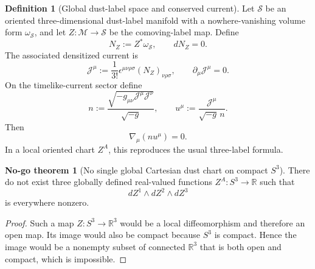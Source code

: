 \documentclass[11pt,a4paper]{article}
\def\dd{d}%
\numberwithin{equation}{section}
\theoremstyle{definition}
\newtheorem{definition}[criterion]{Definition}
\newtheorem{nogotheorem}[criterion]{No-go theorem}
\theoremstyle{plain}
\theoremstyle{remark}
\newcommand{\M}{\mathcal{M}}
\newcommand{\dd}{\mathrm{d}}
\begin{document}
\begin{definition}[Global dust-label space and conserved current]
Let \(\mathcal S\) be an oriented three-dimensional dust-label manifold with
a nowhere-vanishing volume form \(\omega_{\mathcal S}\), and let
\(Z:\M\to\mathcal S\) be the comoving-label map. Define
\begin{equation}
N_Z:=Z^*\omega_{\mathcal S},
\qquad
\dd N_Z=0.
\end{equation}
The associated densitized current is
\begin{equation}
\mathcal J^\mu
:=
\frac1{3!}\epsilon^{\mu\nu\rho\sigma}(N_Z)_{\nu\rho\sigma},
\qquad
\partial_\mu\mathcal J^\mu=0.
\end{equation}
On the timelike-current sector define
\begin{equation}
n
:=
\frac{\sqrt{-g_{\mu\nu}\mathcal J^\mu\mathcal J^\nu}}{\sqrt{-g}},
\qquad
u^\mu
:=
\frac{\mathcal J^\mu}{\sqrt{-g}\,n}.
\end{equation}
Then
\begin{equation}
\nabla_\mu(n u^\mu)=0.
\end{equation}
In a local oriented chart \(Z^A\), this reproduces the usual three-label
formula.
\end{definition}

\begin{nogotheorem}[No single global Cartesian dust chart on compact \(S^3\)]
There do not exist three globally defined real-valued functions \(Z^A:S^3\to\mathbb R\) such that
\begin{equation}
\dd Z^1\wedge\dd Z^2\wedge\dd Z^3
\end{equation}
is everywhere nonzero.
\end{nogotheorem}
\begin{proof}
Such a map \(Z:S^3\to\mathbb R^3\) would be a local diffeomorphism and therefore an open map. Its image would also be compact because \(S^3\) is compact. Hence the image would be a nonempty subset of connected \(\mathbb R^3\) that is both open and compact, which is impossible.
\end{proof}
\end{document}
